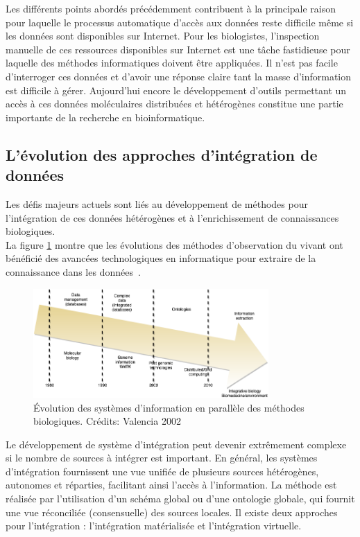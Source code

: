 Les différents points abordés précédemment contribuent à la principale raison pour laquelle le processus automatique d’accès aux données reste difficile même si les données sont disponibles sur Internet. Pour les biologistes, l'inspection manuelle de ces ressources disponibles sur Internet est une tâche fastidieuse pour laquelle des méthodes informatiques doivent être appliquées. Il n’est pas facile d’interroger ces données et d’avoir une réponse claire tant la masse d’information est difficile à gérer. Aujourd'hui encore le développement d'outils permettant un accès à ces données moléculaires distribuées et hétérogènes constitue une partie importante de la recherche en bioinformatique. 

\subsection{L'évolution des approches d'intégration de données}
Les défis majeurs actuels sont liés au développement de méthodes pour l’intégration de ces données hétérogènes et à l’enrichissement de connaissances biologiques.\\
La figure \ref{fig:databases} montre que les évolutions des méthodes d'observation du vivant ont bénéficié des avancées technologiques en informatique pour extraire de la connaissance dans les données~\cite{valencia2002}.

 \begin{figure}[!ht]
    \centering
    \includegraphics[width=0.8\textwidth]{hdr_manuscript/Figures/valencia.png}
    \caption[Évolution des systèmes d'information en parallèle des méthodes biologiques]{Évolution des systèmes d'information en parallèle des méthodes biologiques. Crédits: Valencia 2002~\cite{valencia2002}}
    \label{fig:databases}
\end{figure}
  




Le développement de système d'intégration peut devenir extrêmement complexe si le nombre de sources à intégrer est important. En général, les systèmes d’intégration fournissent une vue unifiée de plusieurs sources hétérogènes, autonomes et réparties, facilitant ainsi l’accès à l’information. La méthode est réalisée par l’utilisation d’un schéma global ou d’une ontologie globale, qui fournit une vue réconciliée (consensuelle) des sources locales. Il existe deux   approches   pour   l’intégration :   l’intégration   matérialisée   et   l’intégration   virtuelle. \\

